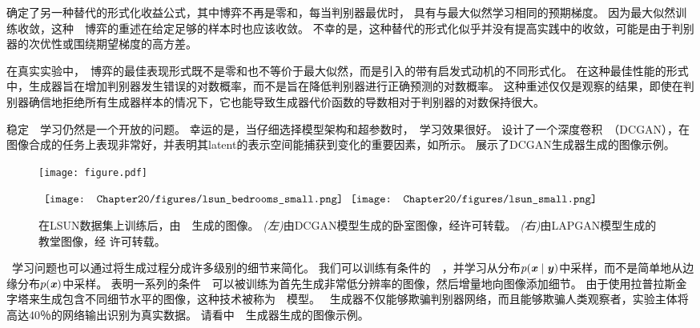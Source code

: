 \citet{Goodfellow-ICLR2015}确定了另一种替代的形式化收益公式，其中博弈不再是零和，每当判别器最优时， 具有与最大似然学习相同的预期梯度。
因为最大似然训练收敛，这种~~博弈的重述在给定足够的样本时也应该收敛。
不幸的是，这种替代的形式化似乎并没有提高实践中的收敛，可能是由于判别器的次优性或围绕期望梯度的高方差。


在真实实验中，~博弈的最佳表现形式既不是零和也不等价于最大似然，而是\citet{Goodfellow-et-al-NIPS2014-small}引入的带有启发式动机的不同形式化。
在这种最佳性能的形式中，生成器旨在增加判别器发生错误的对数概率，而不是旨在降低判别器进行正确预测的对数概率。
这种重述仅仅是观察的结果，即使在判别器确信地拒绝所有生成器样本的情况下，它也能导致生成器代价函数的导数相对于判别器的对数保持很大。

稳定~~学习仍然是一个开放的问题。
幸运的是，当仔细选择模型架构和超参数时，~学习效果很好。
\citet{radford2015unsupervised}设计了一个深度卷积~（DCGAN），在图像合成的任务上表现非常好，并表明其\gls{latent}的表示空间能捕获到变化的重要因素，如所示。
展示了DCGAN生成器生成的图像示例。
 
\begin{figure}[!htb]
\ifOpenSource
\centerline{\texttt{[image: figure.pdf]}}
\else
\centering
$\vcenter{\hbox{
\texttt{[image: Chapter20/figures/lsun\_bedrooms\_small.png]}
}}
\vcenter{\hbox{
\texttt{[image: Chapter20/figures/lsun\_small.png]}
}}$
\fi
\caption{在LSUN数据集上训练后，由~~生成的图像。
\emph{(左)}由DCGAN模型生成的卧室图像，经\citet{radford2015unsupervised}许可转载。
\emph{(右)}由LAPGAN模型生成的教堂图像，经 \citet{denton2015deep}许可转载。
}
\label{fig:chap20_lsun_small}
\end{figure}

~学习问题也可以通过将生成过程分成许多级别的细节来简化。
我们可以训练有条件的~~\citep{mirza2014conditional}，并学习从分布$p(\boldsymbol{\mathit{x}} \mid \boldsymbol{\mathit{y}})$中采样，而不是简单地从边缘分布$p(\boldsymbol{\mathit{x}})$中采样。
\citet{denton2015deep} 表明一系列的条件~~可以被训练为首先生成非常低分辨率的图像，然后增量地向图像添加细节。
由于使用拉普拉斯金字塔来生成包含不同细节水平的图像，这种技术被称为~~模型。
~生成器不仅能够欺骗判别器网络，而且能够欺骗人类观察者，实验主体将高达40％的网络输出识别为真实数据。
请看中~~生成器生成的图像示例。


